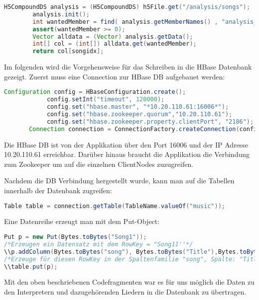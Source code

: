 \begin{lstlisting}[language=Java]
        H5CompoundDS analysis = (H5CompoundDS) h5File.get("/analysis/songs");
        analysis.init();
        int wantedMember = find( analysis.getMemberNames() , "analysis_sample_rate");
        assert(wantedMember >= 0);
        Vector alldata = (Vector) analysis.getData();
        int[] col = (int[]) alldata.get(wantedMember);
        return col[songidx];
\end{lstlisting}

Im folgenden wird die Vorgehensweise für das Schreiben in die HBase Datenbank gezeigt.
Zuerst muss eine Connection zur HBase DB aufgebauet werden:

\begin{lstlisting}[language=Java]
Configuration config = HBaseConfiguration.create();
            config.setInt("timeout", 120000);
            config.set("hbase.master", "*10.20.110.61:16006*");
            config.set("hbase.zookeeper.quorum","10.20.110.61");
            config.set("hbase.zookeeper.property.clientPort", "2186");
	   Connection connection = ConnectionFactory.createConnection(config);
\end{lstlisting}

Die HBase DB ist von der Applikation über den Port 16006 und der IP Adresse 10.20.110.61 erreichbar.
Darüber hinaus braucht die Applikation die Verbindung zum Zookeeper um auf die einzelnen ClientNodes zuzugreifen.

Nachdem die DB Verbindung hergestellt wurde, kann man auf die Tabellen innerhalb der Datenbank zugreifen:

\begin{lstlisting}[language=Java]
Table table = connection.getTable(TableName.valueOf("music"));
\end{lstlisting}

Eine Datenreihe erzeugt man mit dem Put-Object:

\begin{lstlisting}[language=Java]
Put p = new Put(Bytes.toBytes("Song1"));
/*Erzeugen ein Datensatz mit dem RowKey = "Song11''*/
\\p.addColumn(Bytes.toBytes("song"), Bytes.toBytes("Title"),Bytes.toBytes("HISTORY"));
/*Erzeuge für diesen RowKey in der Spaltenfamilie "song", Spalte: "Title" den Wert "HISTORY"*/
\\table.put(p);
\end{lstlisting}

Mit den oben beschriebenen Codefragmenten war es für uns möglich die Daten zu den Interpretern und dazugehörenden Liedern in die Datenbank zu übertragen.

